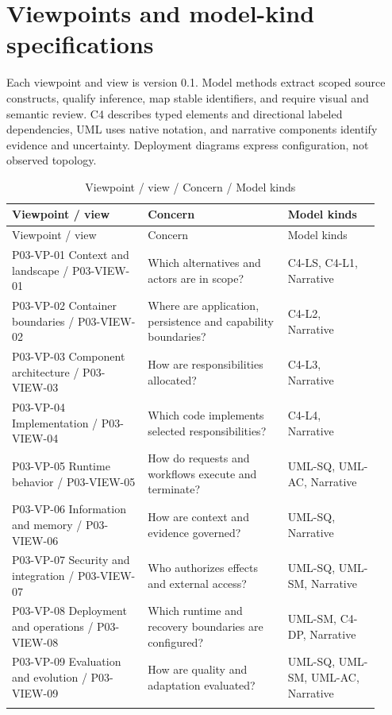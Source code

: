 \documentclass[10pt,letterpaper]{article}
\begin{document}
\section{Viewpoints and model-kind specifications}
Each viewpoint and view is version 0.1. Model methods extract scoped source constructs, qualify inference, map stable identifiers, and require visual and semantic review. C4 describes typed elements and directional labeled dependencies, UML uses native notation, and narrative components identify evidence and uncertainty. Deployment diagrams express configuration, not observed topology.
\begin{longtable}{@{}>{\raggedright\arraybackslash}p{0.34\linewidth}>{\raggedright\arraybackslash}p{0.35\linewidth}>{\raggedright\arraybackslash}p{0.23\linewidth}@{}}
\caption{Viewpoint / view / Concern / Model kinds}\\
\toprule Viewpoint / view & Concern & Model kinds\\\midrule\endfirsthead
\toprule Viewpoint / view & Concern & Model kinds\\\midrule\endhead
P03-VP-01 Context and landscape / P03-VIEW-01 & Which alternatives and actors are in scope? & C4-LS, C4-L1, Narrative\\\addlinespace
P03-VP-02 Container boundaries / P03-VIEW-02 & Where are application, persistence and capability boundaries? & C4-L2, Narrative\\\addlinespace
P03-VP-03 Component architecture / P03-VIEW-03 & How are responsibilities allocated? & C4-L3, Narrative\\\addlinespace
P03-VP-04 Implementation / P03-VIEW-04 & Which code implements selected responsibilities? & C4-L4, Narrative\\\addlinespace
P03-VP-05 Runtime behavior / P03-VIEW-05 & How do requests and workflows execute and terminate? & UML-SQ, UML-AC, Narrative\\\addlinespace
P03-VP-06 Information and memory / P03-VIEW-06 & How are context and evidence governed? & UML-SQ, Narrative\\\addlinespace
P03-VP-07 Security and integration / P03-VIEW-07 & Who authorizes effects and external access? & UML-SQ, UML-SM, Narrative\\\addlinespace
P03-VP-08 Deployment and operations / P03-VIEW-08 & Which runtime and recovery boundaries are configured? & UML-SM, C4-DP, Narrative\\\addlinespace
P03-VP-09 Evaluation and evolution / P03-VIEW-09 & How are quality and adaptation evaluated? & UML-SQ, UML-SM, UML-AC, Narrative\\\addlinespace
\bottomrule\end{longtable}
\end{document}
